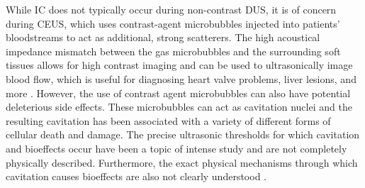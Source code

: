 While \ac{IC} does not typically occur during non-contrast \ac{DUS},
it is of concern during \ac{CEUS}, which uses contrast-agent
microbubbles injected into patients' bloodstreams to act as additional,
strong scatterers. The high acoustical impedance mismatch between the
gas microbubbles and the surrounding soft tissues allows for high
contrast imaging and can be used to ultrasonically image blood flow,
which is useful for diagnosing heart valve problems, liver lesions,
and more \citep{Claudon2013,Rognin2008}. However, the use of contrast
agent microbubbles can also have potential deleterious side
effects. These microbubbles can act as cavitation nuclei and the
resulting cavitation has been associated with a variety of different
forms of cellular death and damage. The precise ultrasonic thresholds
for which cavitation and bioeffects occur have been a topic of intense
study and are not completely physically described. Furthermore, the
exact physical mechanisms through which cavitation causes bioeffects
are also not clearly understood \citep{Barnett1994}.

